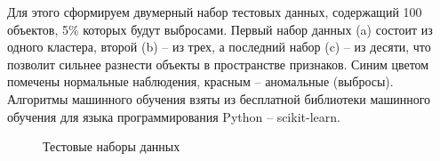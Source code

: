 \documentclass[12pt]{article}
\begin{document}
    \par Для этого сформируем двумерный набор тестовых данных, содержащий 100 объектов, 5\% которых будут выбросами. Первый набор данных (a) состоит из одного кластера, второй (b) -- из трех, а последний набор (c) -- из десяти, что позволит сильнее разнести объекты в пространстве признаков. Синим цветом помечены нормальные наблюдения, красным -- аномальные (выбросы). Алгоритмы машинного обучения взяты из бесплатной библиотеки машинного обучения для языка программирования Python -- scikit-learn.

    \begin{figure}[h!]
        \centering
        \caption{Тестовые наборы данных}
        \label{sec:Research:Model:Visualization:fig:featueres}
    \end{figure}

\end{document}
